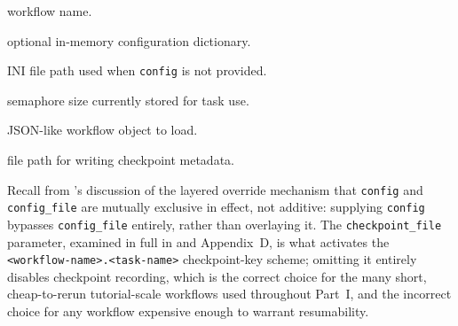 \begin{description}[leftmargin=2.2em, style=nextline]
  \item[\texttt{name}] workflow name.
  \item[\texttt{config}] optional in-memory configuration dictionary.
  \item[\texttt{config\_file}] INI file path used when \texttt{config} is
    not provided.
  \item[\texttt{max\_threads}] semaphore size currently stored for task use.
  \item[\texttt{jsonload}] JSON-like workflow object to load.
  \item[\texttt{checkpoint\_file}] file path for writing checkpoint
    metadata.
\end{description}

Recall from 's discussion of the layered override
mechanism that \texttt{config} and \texttt{config\_file} are mutually
exclusive in effect, not additive: supplying \texttt{config} bypasses
\texttt{config\_file} entirely, rather than overlaying it. The
\texttt{checkpoint\_file} parameter, examined in full in
 and Appendix~D, is what activates the
\texttt{<workflow-name>.<task-name>} checkpoint-key scheme; omitting it
entirely disables checkpoint recording, which is the correct choice for the
many short, cheap-to-rerun tutorial-scale workflows used throughout
Part~I, and the incorrect choice for any workflow expensive enough to
warrant resumability.

